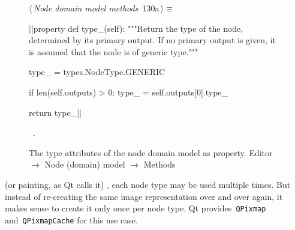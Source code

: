 \documentclass[%
    a4paper,    %
    justified,  %
    nobib,      %
    openany     %
]{tufte-book}
\makeatletter
\renewcommand{\label}[1]{\@tufte@label{##1}}%
\makeatother
\begin{document}
\begin{figure}[!htbp]
\begin{flushleft} \small
\begin{minipage}{\linewidth}\label{scrap71}\raggedright\small
{} $\langle\,${\itshape Node domain model methods}\nobreak\ {\footnotesize {130a}}$\,\rangle\equiv$
\vspace{-1ex}
\begin{pythoncode}
|\normalfont{}\fontfamily{}|property
def type_(self):
    """Return the type of the node, determined by its primary
    output. If no primary output is given, it is assumed that
    the node is of generic type."""

    type_ = types.NodeType.GENERIC

    if len(self.outputs) > 0:
        type_ = self.outputs[0].type_

    return type_|\NWsep|
\end{pythoncode}
\vspace{1.5ex}
\footnotesize
\begin{list}{}{\setlength{\itemsep}{-\parsep}\setlength{\itemindent}{-\leftmargin}}
\item \NWtxtMacroRefIn\ .

\item{}
\end{list}
\end{minipage}\vspace{4ex}
\end{flushleft}
\caption{The type attributes of the node domain model as property.
  \newline{}\newline{}Editor $\rightarrow$ Node (domain) model $\rightarrow$
  Methods}
\end{figure}

 (or painting, as Qt calls it) ,
each node type may be used multiple times. But instead of re-creating the same
image representation over and over again, it makes sense to create it only once
per node type. Qt provides~\verb=QPixmap= and~\verb=QPixmapCache= for this use
case.
\end{document}
